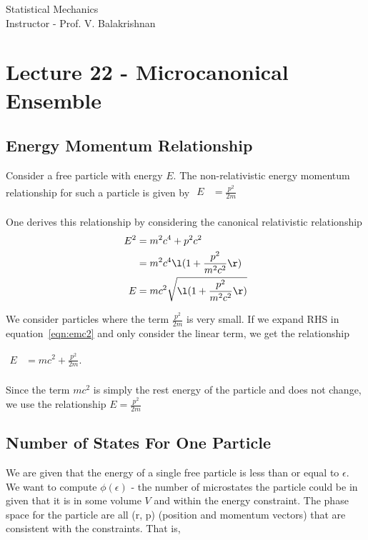\documentclass[12pt]{article}
\begin{document}

\begin{center}
    \Large Statistical Mechanics \\
    Instructor - Prof. V. Balakrishnan
\end{center}

\section{Lecture 22 - Microcanonical Ensemble}

\subsection{Energy Momentum Relationship}
Consider a free particle with energy $E$. The non-relativistic energy momentum
relationship for such a particle is given by
$\begin{aligned}
    E & = \frac{p^2}{2m} \\
\end{aligned}$

One derives this relationship by considering the canonical relativistic 
relationship
\begin{equation} \label{eqn:emc2}
\begin{split}
E^2 & = m^2c^4 + p^2c^2 \\
& = m^2c^4\l( 1 + \frac{p^2}{m^2c^2} \r) \\
E & = mc^2\sqrt{\l( 1 + \frac{p^2}{m^2c^2}\r)}
\end{split}
\end{equation}

We consider particles where the term $\frac{p^2}{2m}$ is very small. If we 
expand RHS in equation~\ref{eqn:emc2} and only consider the linear term, we get 
the relationship

$\begin{aligned}
    E & = mc^2 + \frac{p^2}{2m}. \\
\end{aligned}$

Since the term $mc^2$ is simply the rest energy of the particle and does not 
change, we use the relationship $E = \frac{p^2}{2m}$

\subsection{Number of States For One Particle}
We are given that the energy of a single free particle is less than or equal to 
$\epsilon$. We want to compute $\phi (\epsilon)$ - the number of microstates the
particle could be in given that it is in some volume $V$ and within the energy 
constraint. The phase space for the particle are all (r, p) (position and 
momentum vectors) that are consistent with the constraints. That is, 
\end{document}
